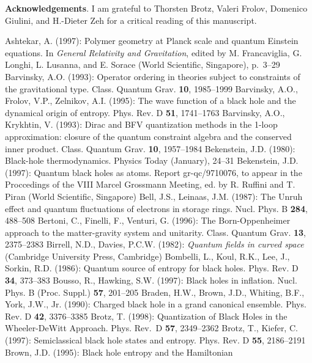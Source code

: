\documentclass[12pt]{article}
\begin{document}
\vskip 3mm
{\bf Acknowledgements}. I am grateful to Thorsten Brotz,
Valeri Frolov, Domenico
Giulini, and H.-Dieter Zeh for a critical reading of this
manuscript.
%
%
%
\begin{thebibliography}{999}
%
\bibitem
Ashtekar, A. (1997): Polymer geometry at Planck scale and quantum
Einstein equations. In {\it General Relativity and Gravitation},
edited by M. Francaviglia, G. Longhi, L. Lusanna, and E. Sorace
(World Scientific, Singapore), p.~3--29
%
\bibitem{}{}{}
Barvinsky, A.O. (1993): Operator ordering in theories subject
to constraints of the gravitational type. Class. Quantum Grav.
{\bf 10}, 1985--1999
%
\bibitem{}{}{}
Barvinsky, A.O., Frolov, V.P., Zelnikov, A.I. (1995):
The wave function of a black hole and the dynamical origin
of entropy. Phys. Rev. D {\bf 51}, 1741--1763
%
\bibitem{}{}{}
Barvinsky, A.O., Krykhtin, V. (1993): Dirac and BFV quantization methods
in the 1-loop approximation: closure of the quantum constraint algebra
and the conserved inner product. Class. Quantum Grav. {\bf 10},
1957--1984
%
\bibitem{}{}{}
Bekenstein, J.D. (1980): Black-hole thermodynamics.
Physics Today (January), 24--31
%
\bibitem{}{}{}
Bekenstein, J.D. (1997): Quantum black holes as atoms. Report
gr-qc/9710076, to appear in the Proccedings of the VIII Marcel
Grossmann Meeting, ed. by R. Ruffini and T. Piran
(World Scientific, Singapore)
%
\bibitem{}{}{}
Bell, J.S., Leinaas, J.M. (1987): The Unruh effect and quantum
fluctuations of electrons in storage rings.
Nucl. Phys. B {\bf 284}, 488--508
%
\bibitem{}{}{}
Bertoni, C., Finelli, F., Venturi, G. (1996): The Born-Oppenheimer
approach to the matter-gravity system and unitarity.
Class. Quantum Grav. {\bf 13}, 2375--2383
%
\bibitem{}{}{}
Birrell, N.D., Davies, P.C.W. (1982): {\it Quantum fields
in curved space} (Cambridge University Press, Cambridge)
%
\bibitem{}{}{}
Bombelli, L., Koul, R.K., Lee, J., Sorkin, R.D. (1986):
Quantum source of entropy for black holes. 
Phys. Rev. D {\bf 34}, 373--383
%
\bibitem{}{}{}
Bousso, R., Hawking, S.W. (1997): Black holes in inflation.
Nucl. Phys. B (Proc. Suppl.) {\bf 57}, 201--205
%
\bibitem{}{}{}
Braden, H.W., Brown, J.D., Whiting, B.F., York, J.W., Jr. (1990):
Charged black hole in a grand canonical ensemble.
Phys. Rev. D {\bf 42}, 3376--3385
%
\bibitem{}{}{}
Brotz, T. (1998): Quantization of Black Holes in the Wheeler-DeWitt
Approach. Phys. Rev.~D {\bf 57}, 2349--2362
%
\bibitem{}{}{}
Brotz, T., Kiefer, C. (1997): Semiclassical black hole states
and entropy. Phys. Rev. D {\bf 55}, 2186--2191
% 
\bibitem{}{}{}
Brown, J.D. (1995): Black hole entropy and the Hamiltonian

\end{thebibliography}
\end{document}
